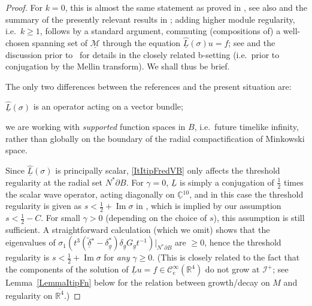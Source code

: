 \documentclass[reqno,11pt,letterpaper]{amsart}
\numberwithin{equation}{section}
\numberwithin{figure}{section}
\theoremstyle{definition}
\theoremstyle{remark}
\newcommand{\mc}{\mathcal}
\newcommand{\cC}{\mc C}
\newcommand{\cM}{\mc M}
\newcommand{\ms}{\mathscr}
\newcommand{\scri}{\ms I}
\newcommand{\C}{\mathbb{C}}
\newcommand{\R}{\mathbb{R}}
\renewcommand{\Im}{\operatorname{Im}}
\newcommand{\ol}{\overline}
\newcommand{\pa}{\partial}
\newcommand{\ul}[1]{\underline{#1}{}}
\newcommand{\wh}{\widehat}
\newcommand{\wt}{\widetilde}
\newcommand{\cp}{{\mathrm{c}}}
\newcommand{\half}{\tfrac{1}{2}}
\newcommand{\CIc}{\cC^\infty_\cp}
\newcommand{\tdel}{\wt{\delta}{}}
\begin{document}
\begin{proof}
  For $k=0$, this is almost the same statement as proved in \cite[\S5]{VasyMicroKerrdS}, see also \cite{BaskinVasyWunschRadMink} and the summary of the presently relevant results in \cite[\S6]{BaskinVasyWunschRadMink2}; adding higher module regularity, i.e.\ $k\geq 1$, follows by a standard argument, commuting (compositions of) a well-chosen spanning set of $\ul\cM$ through the equation $\wh{\ul L}(\sigma)u=f$; see \cite[Proof of Proposition~4.4]{BaskinVasyWunschRadMink} and the discussion prior to~\cite[Theorem~5.4]{HintzVasySemilinear} for details in the closely related b-setting (i.e.\ prior to conjugation by the Mellin transform). We shall thus be brief.
  
  The only two differences between the references and the present situation are:
  \begin{enumerate*}
  \item\label{ItItipFredVB} $\hat{\ul L}(\sigma)$ is an operator acting on a vector bundle;
  \item\label{ItItipFredSupp} we are working with \emph{supported} function spaces in $B$, i.e.\ future timelike infinity, rather than globally on the boundary of the radial compactification of Minkowski space. 
  \end{enumerate*}
  Since $\hat{\ul L}(\sigma)$ is principally scalar, \eqref{ItItipFredVB} only affects the threshold regularity at the radial set $N^*\pa B$. For $\gamma=0$, $\ul L$ is simply a conjugation of $\half$ times the scalar wave operator, acting diagonally on $\ul\C^{10}$, and in this case the threshold regularity is given as $s<\half+\Im\sigma$ in \cite[\S6]{BaskinVasyWunschRadMink2}, which is implied by our assumption $s<\half-C$. For small $\gamma>0$ (depending on the choice of $s$), this assumption is still sufficient. A straightforward calculation (which we omit) shows that the eigenvalues of $\sigma_1(t^3(\ul\tdel^*-\delta_{\ul g}^*)\delta_{\ul g}G_{\ul g}t^{-1})|_{N^*\pa B}$ are $\geq 0$, hence the threshold regularity is $s<\half+\Im\sigma$ for \emph{any} $\gamma\geq 0$. (This is closely related to the fact that the components of the solution of $\ul L u=f\in\CIc(\R^4)$ do not grow at $\scri^+$; see Lemma~\ref{LemmaItipFn} below for the relation between growth/decay on $M$ and regularity on $\ol{\R^4}$.)


\end{proof}
\end{document}
